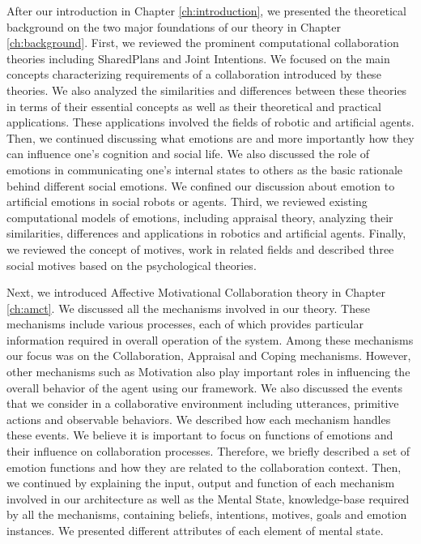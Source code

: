 \documentclass[12pt]{report}
\begin{document}
After our introduction in Chapter \ref{ch:introduction}, we presented the
theoretical background on the two major foundations of our theory in Chapter
\ref{ch:background}. First, we reviewed the prominent computational
collaboration theories including SharedPlans and Joint Intentions. We focused on
the main concepts characterizing requirements of a collaboration introduced by
these theories. We also analyzed the similarities and differences between these
theories in terms of their essential concepts as well as their theoretical and
practical applications. These applications involved the fields of robotic and
artificial agents. Then, we continued discussing what emotions are and more
importantly how they can influence one's cognition and social life. We also
discussed the role of emotions in communicating one's internal states to others
as the basic rationale behind different social emotions. We confined our
discussion about emotion to artificial emotions in social robots or agents.
Third, we reviewed existing computational models of emotions, including
appraisal theory, analyzing their similarities, differences and applications in
robotics and artificial agents. Finally, we reviewed the concept of motives,
work in related fields and described three social motives based on the
psychological theories.

Next, we introduced Affective Motivational Collaboration theory in Chapter
\ref{ch:amct}. We discussed all the mechanisms involved in our theory. These
mechanisms include various processes, each of which provides particular
information required in overall operation of the system. Among these mechanisms
our focus was on the Collaboration, Appraisal and Coping mechanisms. However,
other mechanisms such as Motivation also play important roles in influencing the
overall behavior of the agent using our framework. We also discussed the
events that we consider in a collaborative environment including utterances,
primitive actions and observable behaviors. We described how each mechanism
handles these events. We believe it is important to focus on functions of
emotions and their influence on collaboration processes. Therefore, we briefly
described a set of emotion functions and how they are related to the
collaboration context. Then, we continued by explaining the input, output and
function of each mechanism involved in our architecture as well as the Mental
State, knowledge-base required by all the mechanisms, containing beliefs,
intentions, motives, goals and emotion instances. We presented different
attributes of each element of mental state.
\end{document}
